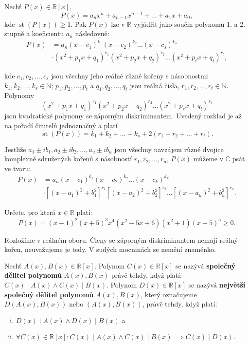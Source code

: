 \begin{veta}
  Nechť $P(x) \in \mathbb R [x]$,
  $$P(x) = a_n x^n + a_{n-1} x^{n-1} + \dots + a_1 x + a_0,$$
  kde $\operatorname{st}(P(x)) \geq 1$. Pak $P(x)$ lze v $\mathbb R$ vyjádřit jako součin polynomů 1. a 2. stupně a koeficientu $a_n$ následovně:
  \begin{align*}
    P(x) & = a_n(x-c_1)^{k_1}(x-c_2)^{k_2} \dots (x-c_s)^{k_s}\\
    & \cdot (x^2+p_1 x + q_1)^{r_1}(x^2+p_2 x + q_2)^{r_2} \dots (x^2+p_t x + q_t)^{r_t},
  \end{align*}


  kde $c_1,c_2, \dots, c_s$ jsou všechny jeho reálné různé kořeny s násobnostmi $k_1, k_2, \dots, k_s \in \mathbb N$;
  $p_1, p_2, \dots, p_t$ a $q_1, q_2, \dots, q_t$ jsou reálná čísla, $r_1, r_2, \dots, r_t \in \mathbb N$.
  Polynomy
  $$(x^2+p_1 x + q_1)^{r_1}(x^2+p_2 x + q_2)^{r_2} \dots (x^2+p_r x + q_t)^{r_t}$$
  jsou kvadratické polynomy se záporným diskriminantem. Uvedený rozklad je až na pořadí činitelů
  jednoznačný a platí
  $$\operatorname{st}(P(x)) = k_1 + k_2 + \dots + k_s + 2(r_1 + r_2 + \dots + r_t).$$

  Jestliže $a_1 \pm ib_1, a_2 \pm ib_2, \dots, a_u \pm ib_u$ jsou všechny navzájem různé
  dvojice komplexně sdružených kořenů s násobností $r_1, r_2, \dots, r_u$, $P(x)$ můžeme v $\mathbb C$ psát ve tvaru:
  \begin{align*}
    P(x) & = a_n(x-c_1)^{k_1}(x-c_2)^{k_2} \dots (x-c_k)^{k_k}\\
    & \cdot  \left [(x-a_1)^2+b_1^2\right ]^{r_1}\left [(x-a_2)^2+b_2^2\right]^{r_2} \dots \left [(x-a_u)^2+b_u^2\right ]^{r_u}.
  \end{align*}
\end{veta}

\begin{priklad}
    Určete, pro která $x \in \mathbb R$ platí:
    $$P(x)=(x-1)^2(x+5)^3x^4(x^2-5x+6)(x^2+1)(x-5)^5 \geq 0.$$
\end{priklad}

\begin{reseni}
Rozložíme v reálném oboru. Členy se záporným diskriminantem nemají reálný kořen,
neuvažujeme je tedy. V sudých mocninách se nemění znaménko.
\end{reseni}

\begin{definition}
  Nechť $A(x), B(x) \in \mathbb R [x]$. Polynom $C(x) \in \mathbb R [x]$ se nazývá \textbf{společný dělitel polynomů} $A(x), B(x)$
  právě tehdy, když platí: $C(x) \mid A(x) \land C(x) \mid B(x)$.
  Polynom $D(x) \in \mathbb R [x]$ se nazývá \textbf{největší společný dělitel polynomů} $A(x), B(x)$, který označujeme $D(A(x), B(x))$ nebo $(A(x), B(x))$, právě tehdy, když platí:
  \begin{enumerate}[i.]
    \item $D(x) \mid A(x) \land D(x) \mid B(x)$ a
    \item $\forall C(x) \in \mathbb R [x]: C(x) \mid A(x) \land C(x) \mid B(x) \implies C(x) \mid D(x).$
  \end{enumerate}
\end{definition}

